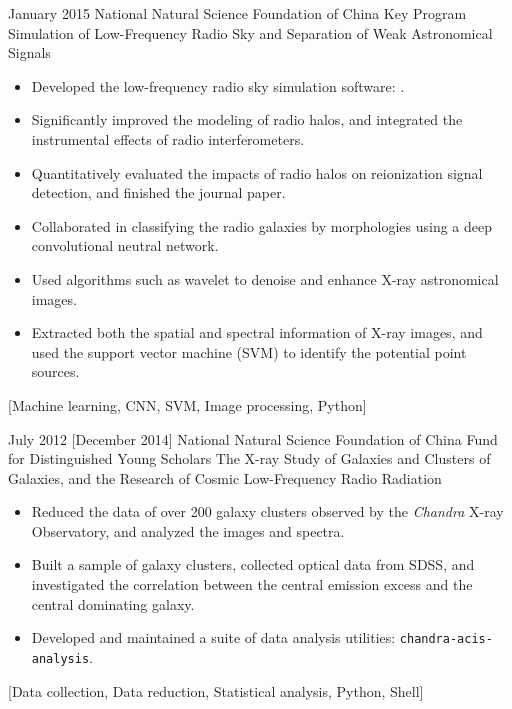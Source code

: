 \documentclass{resume}
\begin{document}
\begin{projects}
  \project
    {January 2015}%
    {National Natural Science Foundation of China}%
    {Key Program}%
    {Simulation of Low-Frequency Radio Sky and Separation of Weak
     Astronomical Signals}%
    {\begin{itemize}
      \item Developed the low-frequency radio sky simulation software:
        .
      \item Significantly improved the modeling of radio halos,
        and integrated the instrumental effects of radio interferometers.
      \item Quantitatively evaluated the impacts of radio halos on
        reionization signal detection, and finished the journal paper.
      \item Collaborated in classifying the radio galaxies by morphologies
        using a deep convolutional neutral network.
      \item Used algorithms such as wavelet to denoise and enhance X-ray
        astronomical images.
      \item Extracted both the spatial and spectral information of X-ray
        images, and used the support vector machine (SVM) to identify the
        potential point sources.
    \end{itemize}}%
    [Machine learning, CNN, SVM, Image processing, Python]

  \separator{0.7em}
  \project
    {July 2012}%
    [December 2014]%
    {National Natural Science Foundation of China}%
    {Fund for Distinguished Young Scholars}%
    {The X-ray Study of Galaxies and Clusters of Galaxies,
      and the Research of Cosmic Low-Frequency Radio Radiation}%
    {\begin{itemize}
      \item Reduced the data of over 200 galaxy clusters observed by the
        \textit{Chandra} X-ray Observatory, and analyzed the images and
        spectra.
      \item Built a sample of galaxy clusters, collected optical data from
        SDSS, and investigated the correlation between the central emission
        excess and the central dominating galaxy.
      \item Developed and maintained a suite of data analysis utilities:
          {\texttt{chandra-acis-analysis}}.
    \end{itemize}}%
    [Data collection, Data reduction, Statistical analysis, Python, Shell]
\end{projects}
\end{document}
